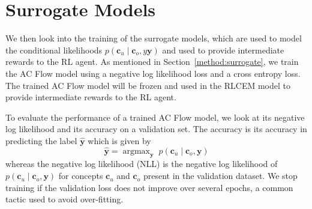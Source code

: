 \section{Surrogate Models}\label{eval:surrogate}

We then look into the training of the 
surrogate models, which are used to model the conditional
likelihoods $p(\mathbf{c}_u \mid \mathbf{c}_o,y \mathbf{y})$ and used 
to provide intermediate rewards to the RL agent.
As mentioned in Section~\ref{method:surrogate}, 
we train the AC Flow model
using a negative log likelihood loss and a cross
entropy loss. The trained AC Flow model
will be frozen and used in the RLCEM model
to provide intermediate rewards to the RL agent.

To evaluate the performance of a trained 
AC Flow model, we look at 
its negative log likelihood and its accuracy on a validation set.
The accuracy is its accuracy in predicting 
the label $\hat{\mathbf{y}}$ which is given by 
\[\hat{\mathbf{y}} = \mathrm{\mathop{argmax}}_{\mathbf{y}} \;
p(\mathbf{c}_u \mid \mathbf{c}_o, \mathbf{y})\]
whereas the negative log likelihood (NLL) is the 
negative log likelihood of 
$p(\mathbf{c}_u \mid \mathbf{c}_o, \mathbf{y})$
for concepts $\mathbf{c}_u$ and $\mathbf{c}_o$ 
present in the validation dataset. We stop training if the validation loss
does not improve over several epochs, a common tactic used
to avoid over-fitting.

